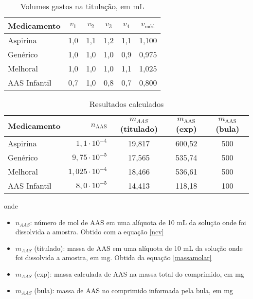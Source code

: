 \begin{table}[H]\label{titulacao_exp1}
    \centering
    \begin{tabular}{l c c c c c}

        \toprule
        Medicamento & $v_1$  & $v_2$ & $v_3$ & $v_4$ & $v_{\textrm{méd}}$ \\
        \midrule
        Aspirina\R     & 1,0 & 1,1 & 1,2 & 1,1 & 1,100 \\
        Genérico     & 1,0 & 1,0 & 1,0 & 0,9 & 0,975  \\
        Melhoral     & 1,0 & 1,0 & 1,0 & 1,1 & 1,025\\
        AAS Infantil & 0,7 & 1,0 & 0,8 & 0,7 & 0,800\\
       \bottomrule

    \end{tabular}
    \caption{Volumes gastos na titulação, em mL}
\end{table}

\begin{table}[H]\label{res_calculados_exp1}
    \centering
    \begin{tabular}{l r c c c }
        \toprule
        Medicamento & $n_{\textrm{AAS}}$ &$m_{AAS}$(titulado)& 
        $m_{\textrm{AAS}}$(exp) & $m_{\textrm{AAS}}$ (bula) \\

        \midrule
        Aspirina\R     & $1,1\cdot 10^{-4}$   &19,817 & 600,52 & 500\\
        Genérico     & $9,75\cdot 10^{-5}$  & 17,565 & 535,74 & 500 \\
        Melhoral     & $1,025\cdot 10^{-4}$ & 18,466 & 536,61 & 500 \\
        AAS Infantil & $8,0\cdot 10^{-5}$   & 14,413 & 118,18 & 100 \\
        \bottomrule
    \end{tabular}
    \caption{Resultados calculados}
\end{table}

onde
\begin{itemize}
    \item[] $n_{AAS}$: número de mol de AAS em uma alíquota  de 10 mL da solução 
        onde foi dissolvida a amostra. Obtido com a equação \eqref{ncv}
    \item[] $m_{AAS}$ (titulado): massa de AAS em uma alíquota de 10 mL da solução
        onde foi dissolvida a amostra, em mg.
        Obtida da equação \eqref{massamolar}
    \item[]$m_{AAS}$ (exp): massa calculada de AAS na massa total do comprimido, em mg
    \item[] $m_{AAS}$ (bula): massa de AAS no comprimido informada pela bula, em mg
\end{itemize}


